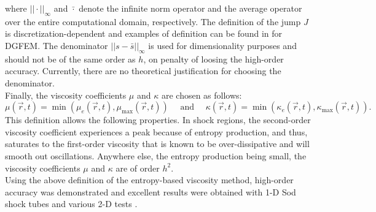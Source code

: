 \documentclass[preprint,10pt]{elsarticle}
\begin{document}
where $|| \cdot ||_{\infty}$ and $\bar{\cdot}$ denote the infinite norm operator and the average operator over the entire computational domain, respectively. The definition of the jump $J$ is discretization-dependent and examples of definition can be found in \cite{valentin} for DGFEM. The denominator $|| s - \bar{s} ||_{\infty}$ is used for dimensionality purposes and should not be of the same order as $h$, on penalty of loosing the high-order accuracy. Currently, there are no theoretical justification for choosing the denominator. \\
Finally, the viscosity coefficients $\mu$ and $\kappa$ are chosen as follows:
\begin{equation}
\mu(\vec{r},t) = \min\left( \mu_e(\vec{r},t), \mu_{\max}(\vec{r},t) \right) \quad \text{ and } \quad \kappa(\vec{r},t) = \min\left( \kappa_e(\vec{r},t), \kappa_{\max}(\vec{r},t) \right).
\end{equation}
This definition allows the following properties.
In shock regions, the second-order viscosity coefficient experiences a peak because of entropy production, and thus, saturates to the first-order viscosity that is known to be over-dissipative and will smooth out oscillations. Anywhere else, the entropy production being small, the viscosity coefficients $\mu$ and $\kappa$ are of order $h^2$.\\
Using the above definition of the entropy-based viscosity method, high-order accuracy was demonstrated and excellent results were obtained with 1-D Sod shock tubes and various 2-D tests \cite{jlg1, jlg2, valentin}.
\end{document}
